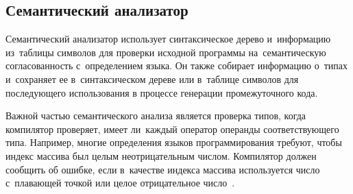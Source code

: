 \subsection{Семантический анализатор} \label{sub115}

Семантический анализатор использует синтаксическое дерево и~информацию из~таблицы символов для проверки исходной программы на~семантическую согласованность с~определением языка. Он также собирает информацию о~типах и~сохраняет ее в~синтаксическом дереве или в~таблице символов для последующего использования в процессе генерации промежуточного кода.

Важной частью семантического анализа является проверка типов, когда компилятор проверяет, имеет ли~каждый оператор операнды соответствующего типа. Например, многие определения языков программирования требуют, чтобы индекс массива был целым неотрицательным числом. Компилятор должен сообщить об ошибке, если в~качестве индекса массива используется число с~плавающей точкой или целое отрицательное число~\cite{web1}.